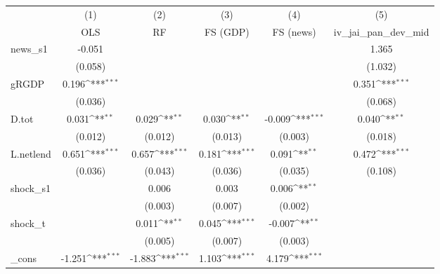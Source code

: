 {
\def\sym#1{\ifmmode^{#1}\else\(^{#1}\)\fi}
\begin{tabular}{l*{5}{c}}
\toprule
            &\multicolumn{1}{c}{(1)}&\multicolumn{1}{c}{(2)}&\multicolumn{1}{c}{(3)}&\multicolumn{1}{c}{(4)}&\multicolumn{1}{c}{(5)}\\
            &\multicolumn{1}{c}{OLS}&\multicolumn{1}{c}{RF}&\multicolumn{1}{c}{FS (GDP)}&\multicolumn{1}{c}{FS (news)}&\multicolumn{1}{c}{iv\_jai\_pan\_dev\_mid}\\
\midrule
news\_s1     &      -0.051         &                     &                     &                     &       1.365         \\
            &     (0.058)         &                     &                     &                     &     (1.032)         \\
\addlinespace
gRGDP       &       0.196\sym{***}&                     &                     &                     &       0.351\sym{***}\\
            &     (0.036)         &                     &                     &                     &     (0.068)         \\
\addlinespace
D.tot       &       0.031\sym{**} &       0.029\sym{**} &       0.030\sym{**} &      -0.009\sym{***}&       0.040\sym{**} \\
            &     (0.012)         &     (0.012)         &     (0.013)         &     (0.003)         &     (0.018)         \\
\addlinespace
L.netlend   &       0.651\sym{***}&       0.657\sym{***}&       0.181\sym{***}&       0.091\sym{**} &       0.472\sym{***}\\
            &     (0.036)         &     (0.043)         &     (0.036)         &     (0.035)         &     (0.108)         \\
\addlinespace
shock\_s1    &                     &       0.006         &       0.003         &       0.006\sym{**} &                     \\
            &                     &     (0.003)         &     (0.007)         &     (0.002)         &                     \\
\addlinespace
shock\_t     &                     &       0.011\sym{**} &       0.045\sym{***}&      -0.007\sym{**} &                     \\
            &                     &     (0.005)         &     (0.007)         &     (0.003)         &                     \\
\addlinespace
\_cons      &      -1.251\sym{***}&      -1.883\sym{***}&       1.103\sym{***}&       4.179\sym{***}&                     \\

\end{tabular}}
